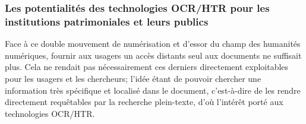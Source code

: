 
\subsubsection{Les potentialités des technologies OCR/HTR pour les institutions patrimoniales et leurs publics} 

Face à ce double mouvement de numérisation et d'essor du champ des humanités numériques, fournir aux usagers un accès distants seul aux documents ne suffisait plus. Cela ne rendait pas nécessairement ces derniers directement exploitables pour les usagers et les chercheurs; l'idée étant de pouvoir chercher une information très spécifique et localisé dans le document, c'est-à-dire de les rendre directement requêtables par la recherche plein-texte, d'où l'intérêt porté aux technologies OCR/HTR. 

